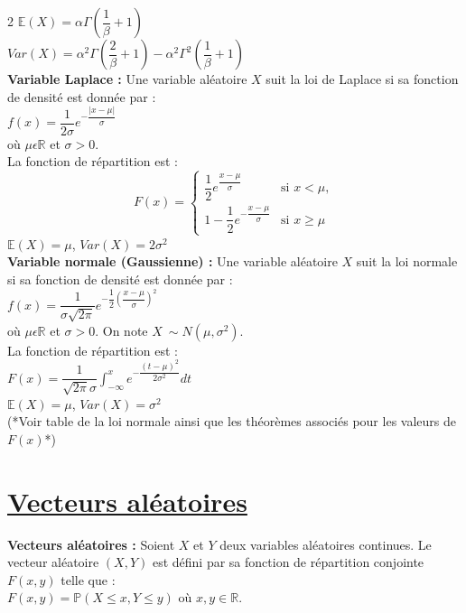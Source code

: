 \documentclass[11pt]{article}
\begin{document}
\begin{multicols}{2}
  $\mathbb{E}(X) = \alpha \Gamma(\dfrac{1}{\beta} + 1)$ \\
  $Var(X) = \alpha^2 \Gamma(\dfrac{2}{\beta} + 1) - \alpha^2 \Gamma^2(\dfrac{1}{\beta} + 1)$ \\


  \textbf{Variable Laplace :} Une variable aléatoire $X$ suit la loi de Laplace si sa fonction de densité est donnée par : \\
  $f(x) =\dfrac{1}{2\sigma} e^{-\dfrac{|x - \mu|}{\sigma}}$ \\
  où $\mu \epsilon \mathbb{R}$ et $\sigma > 0$. \\
  La fonction de répartition est : \\
  \[
  F(x) =
  \begin{cases}
    \dfrac{1}{2} e^{\dfrac{x - \mu}{\sigma}} & \text{si } x < \mu, \\
    1 - \dfrac{1}{2} e^{-\dfrac{x - \mu}{\sigma}} & \text{si } x \geq \mu
  \end{cases}
  \] 
  $\mathbb{E}(X) = \mu$, 
  $Var(X) = 2\sigma^2$ \\


  \textbf{Variable normale (Gaussienne) :} Une variable aléatoire $X$ suit la loi normale si sa fonction de densité est donnée par : \\
  $f(x) = \dfrac{1}{\sigma \sqrt{2\pi}} e^{-\dfrac{1}{2} \left( \dfrac{x - \mu}{\sigma} \right)^2}$ \\
  où $\mu \epsilon \mathbb{R}$ et $\sigma > 0$. On note $X~\sim N(\mu, \sigma^2)$. \\
  La fonction de répartition est : \\
  $F(x) = \dfrac{1}{\sqrt{2\pi}\sigma} \int_{-\infty}^{x} e^{-\dfrac{(t - \mu)^2}{2\sigma^2}} dt$ \\
  $\mathbb{E}(X) = \mu$,
  $Var(X) = \sigma^2$ \\
  (*Voir table de la loi normale ainsi que les théorèmes associés pour les valeurs de $F(x)$*) \\


  \section{\underline{Vecteurs aléatoires}}

  \textbf{Vecteurs aléatoires :} Soient $X$ et $Y$ deux variables aléatoires continues. Le vecteur aléatoire $(X, Y)$ est défini par sa fonction de répartition conjointe $F(x, y)$ telle que : \\
  $F(x,y) = \mathbb{P}(X \leq x, Y \leq y)$ où $x, y \in \mathbb{R}$. \\


\end{multicols}
\end{document}
